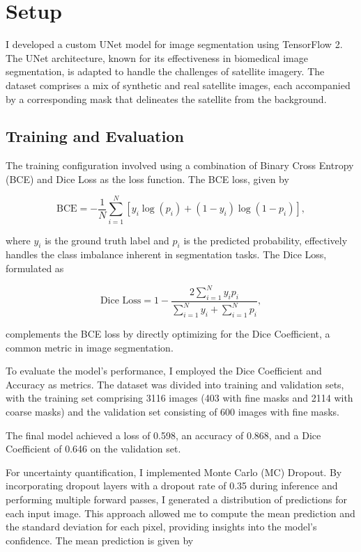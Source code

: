 \documentclass{article}
\begin{document}
\section{Setup}
I developed a custom UNet model for image segmentation using TensorFlow 2. The UNet architecture, 
known for its effectiveness in biomedical image segmentation, is adapted to handle the challenges 
of satellite imagery. The dataset comprises a mix of synthetic and real satellite images, each 
accompanied by a corresponding mask that delineates the satellite from the background.

\subsection{Training and Evaluation}

The training configuration involved using a combination of Binary Cross Entropy (BCE) and Dice Loss 
as the loss function. The BCE loss, given by

\[
\text{BCE} = -\frac{1}{N} \sum_{i=1}^{N} [y_i \log(p_i) + (1 - y_i) \log(1 - p_i)],
\]

where \( y_i \) is the ground truth label and \( p_i \) is the predicted probability, effectively 
handles the class imbalance inherent in segmentation tasks. The Dice Loss, formulated as

\[
\text{Dice Loss} = 1 - \frac{2 \sum_{i=1}^{N} y_i p_i}{\sum_{i=1}^{N} y_i + \sum_{i=1}^{N} p_i},
\]

complements the BCE loss by directly optimizing for the Dice Coefficient, a common metric in image 
segmentation.

To evaluate the model’s performance, I employed the Dice Coefficient and Accuracy as metrics. The 
dataset was divided into training and validation sets, with the training set comprising 3116 images 
(403 with fine masks and 2114 with coarse masks) and the validation set consisting of 600 images 
with fine masks.

The final model achieved a loss of 0.598, an accuracy of 0.868, and a Dice Coefficient of 0.646 on 
the validation set.

For uncertainty quantification, I implemented Monte Carlo (MC) Dropout. By incorporating dropout 
layers with a dropout rate of 0.35 during inference and performing multiple forward passes, I generated 
a distribution of predictions for each input image. This approach allowed me to compute the mean prediction 
and the standard deviation for each pixel, providing insights into the model’s confidence. The mean 
prediction is given by
\end{document}
